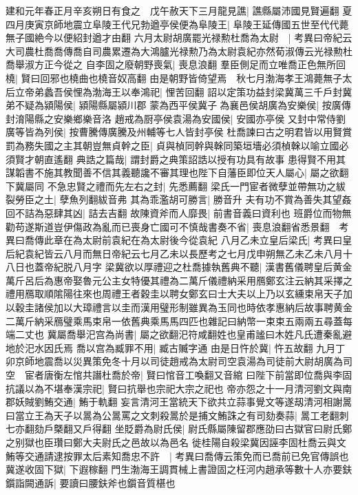 建和元年春正月辛亥朔日有食之　戊午赦天下三月龍見譙|{
	譙縣屬沛國見賢遍翻}
夏四月庚寅京師地震立阜陵王代兄勃遒亭侯便為阜陵王|{
	阜陵王延傳國五世至代代薨無子國絶今以便紹封遒才由翻}
六月太尉胡廣罷光禄勲杜喬為太尉　|{
	考異曰帝紀云大司農杜喬喬傳喬自司農累遷為大鴻臚光禄勲乃為太尉袁紀亦然荀淑傳云光禄勲杜喬舉淑方正今從之}
自李固之廢朝野喪氣|{
	喪息浪翻}
羣臣側足而立唯喬正色無所回橈|{
	賢曰回邪也橈曲也橈音奴高翻}
由是朝野皆倚望焉　秋七月渤海孝王鴻薨無子太后立帝弟蠡吾侯悝為渤海王以奉鴻祀|{
	悝苦回翻}
詔以定策功益封梁冀萬三千戶封冀弟不疑為潁陽侯|{
	潁陽縣屬潁川郡}
蒙為西平侯冀子為襄邑侯胡廣為安樂侯|{
	按廣傳封淯陽縣之安樂鄉樂音洛}
趙戒為厨亭侯袁湯為安國侯|{
	安國亦亭侯}
又封中常侍劉廣等皆為列侯|{
	按曹騰傳廣騰及州輔等七人皆封亭侯}
杜喬諫曰古之明君皆以用賢賞罰為務失國之主其朝豈無貞幹之臣|{
	貞與楨同幹與榦同築垣墻必須楨榦以喻立國必須賢才朝直遙翻}
典誥之篇哉|{
	謂封爵之典策詔誥以授有功具有故事}
患得賢不用其謀韜書不施其教聞善不信其義聽讒不審其理也陛下自藩臣即位天人屬心|{
	屬之欲翻下冀屬同}
不急忠賢之禮而先左右之封|{
	先悉薦翻}
梁氏一門宦者微孽並帶無功之紱裂勞臣之土|{
	孽魚列翻紱音弗}
其為乖濫胡可勝言|{
	勝音升}
夫有功不賞為善失其望姦回不詰為惡肆其凶|{
	詰去吉翻}
故陳資斧而人靡畏|{
	前書音義曰資利也}
班爵位而物無勸苟遂斯道豈伊傷政為亂而已喪身亡國可不慎哉書奏不省|{
	喪息浪翻省悉景翻　考異曰喬傳此章在為太尉前袁紀在為太尉後今從袁紀}
八月乙未立皇后梁氏|{
	考異曰皇后紀袁紀皆云八月而無日帝紀云七月乙未以長歷考之七月戊申朔無乙未乙未八月十八日也蓋帝紀脱八月字}
梁冀欲以厚禮迎之杜喬據執舊典不聽|{
	漢書舊儀聘皇后黄金萬斤呂后為惠帝娶魯元公主女特優其禮為二萬斤儀禮納采用鴈鄭玄注云納其采擇之禮用鴈取順隂陽往來也周禮王者穀圭以聘女鄭玄曰士大夫以上乃以玄纁束帛天子加以穀圭諸侯加以大璋禮言以圭而漢用璧形制雖異為玉同也時依孝惠納后故事聘黄金二萬斤納采鴈璧乘馬束帛一依舊典乘馬馬四匹也雜記曰納幣一束束五兩兩五尋蓋每端二丈也}
冀屬喬舉汜宫為尚書|{
	屬之欲翻汜符咸翻姓也皇甫謐曰木姓凡氏遭秦亂避地於汜水因氏焉}
喬以宫為臧罪不用|{
	臧古贓字通}
由是日忤於冀|{
	忤五故翻}
九月丁卯京師地震喬以災異策免冬十月以司徒趙戒為太尉司空袁湯為司徒前大尉胡廣為司空　宦者唐衡左悺共譖杜喬於帝|{
	賢曰悺音工喚翻又音綰}
曰陛下前當即位喬與李固抗議以為不堪奉漢宗祀|{
	賢曰抗舉也宗祀大宗之祀也}
帝亦怨之十一月清河劉文與南郡妖賊劉鮪交通|{
	鮪于軌翻}
妄言清河王當統天下欲共立蒜事覺文等遂刼清河相謝暠曰當立王為天子以暠為公暠罵之文刺殺暠於是捕文鮪誅之有司劾奏蒜|{
	暠工老翻刺七亦翻劾戶槩翻又戶得翻}
坐貶爵為尉氏侯|{
	尉氏縣屬陳留郡應劭曰古獄官曰尉氏鄭之别獄也臣瓚曰鄭大夫尉氏之邑故以為邑名}
徙桂陽自殺梁冀因誣李固杜喬云與文鮪等交通請逮按罪太后素知喬忠不許　|{
	考異曰喬傳云策免而已喬前已免官傳誤也}
冀遂收固下獄|{
	下遐稼翻}
門生渤海王調貫械上書證固之枉河内趙承等數十人亦要鈇鑕詣闕通訴|{
	要讀曰腰鈇斧也鑕音質椹也}
